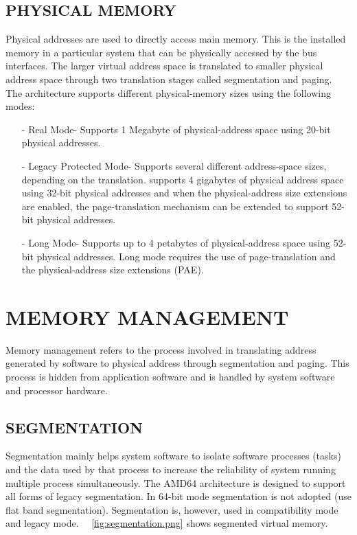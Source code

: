 \documentclass[a4paper,12pt]{report}
\begin{document}
\subsection {PHYSICAL MEMORY}
Physical addresses are used to directly access main memory. This is the installed memory in a particular system that can be physically accessed by the bus interfaces. The larger virtual address space is translated to smaller physical address space through two translation stages called segmentation and paging. The architecture supports different physical-memory sizes using the following modes:
\begin{itemize}

\item[-] Real Mode- Supports 1 Megabyte of physical-address space using 20-bit physical addresses.
\item[-] Legacy Protected Mode- Supports several different address-space sizes, depending on the translation. supports 4 gigabytes of physical address space using 32-bit physical addresses and when the physical-address size extensions are enabled, the page-translation mechanism can be extended to support 52-bit physical addresses.
\item[-] Long Mode- Supports up to 4 petabytes of physical-address space using 52-bit physical addresses. Long mode requires the use of page-translation and the physical-address size extensions (PAE).
\end{itemize}

\section{MEMORY MANAGEMENT}


Memory management refers to the process involved in translating address generated by software to physical address through segmentation and paging. This process is hidden from application software and is handled by system software and processor hardware. 

\subsection{SEGMENTATION} 
Segmentation mainly helps system software to isolate software processes (tasks) and the data used by that process to increase the reliability of system running multiple process simultaneously. The AMD64 architecture is designed to support all forms of legacy segmentation. In 64-bit mode segmentation is not adopted (use flat band segmentation). Segmentation is, however, used in compatibility mode and legacy mode. 
~\figurename~{\ref{fig:segmentation.png}} shows segmented virtual memory.
\end{document}
